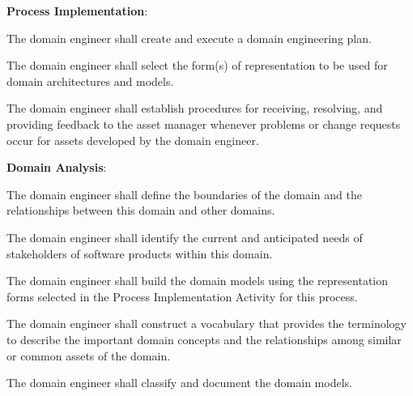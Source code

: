 			\begin{adjustwidth}{2em}{0pt} 

				\begin{compactenum}

					\item {\bf Process Implementation}:

					\begin{compactenum}

						\item The domain engineer shall create and execute a domain engineering plan.

						\item The domain engineer shall select the form(s) of representation to be used for domain architectures and models.

						\item The domain engineer shall establish procedures for receiving, resolving, and providing feedback to the asset manager whenever problems or change requests occur for assets developed by the domain engineer.

					\end{compactenum}

					\item {\bf Domain Analysis}:

					\begin{compactenum}

						\item The domain engineer shall define the boundaries of the domain and the relationships between this domain and other domains.

						\item The domain engineer shall identify the current and anticipated needs of stakeholders of software products within this domain.

						\item The domain engineer shall build the domain models using the representation forms selected in the Process Implementation Activity for this process.

						\item The domain engineer shall construct a vocabulary that provides the terminology to describe the important domain concepts and the relationships among similar or common assets of the domain.

						\item The domain engineer shall classify and document the domain models.


\end{compactenum}
\end{compactenum}
\end{adjustwidth}
